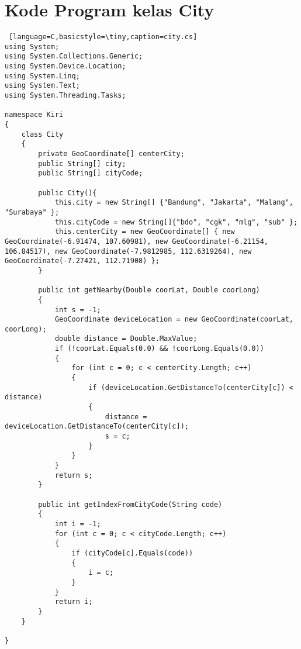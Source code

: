 \chapter{Kode Program kelas City}
\label{app:D}

\singlespacing 
%
%

\begin{lstlisting} [language=C,basicstyle=\tiny,caption=city.cs]
using System;
using System.Collections.Generic;
using System.Device.Location;
using System.Linq;
using System.Text;
using System.Threading.Tasks;

namespace Kiri
{
    class City
    {
        private GeoCoordinate[] centerCity;
        public String[] city;
        public String[] cityCode;

        public City(){
            this.city = new String[] {"Bandung", "Jakarta", "Malang", "Surabaya" };
            this.cityCode = new String[]{"bdo", "cgk", "mlg", "sub" };
            this.centerCity = new GeoCoordinate[] { new GeoCoordinate(-6.91474, 107.60981), new GeoCoordinate(-6.21154, 106.84517), new GeoCoordinate(-7.9812985, 112.6319264), new GeoCoordinate(-7.27421, 112.71908) };
        }

        public int getNearby(Double coorLat, Double coorLong)
        {
            int s = -1;
            GeoCoordinate deviceLocation = new GeoCoordinate(coorLat, coorLong);
            double distance = Double.MaxValue;
            if (!coorLat.Equals(0.0) && !coorLong.Equals(0.0))
            {
                for (int c = 0; c < centerCity.Length; c++)
                {
                    if (deviceLocation.GetDistanceTo(centerCity[c]) < distance)
                    {
                        distance = deviceLocation.GetDistanceTo(centerCity[c]);
                        s = c;
                    }
                }
            }
            return s;
        }

        public int getIndexFromCityCode(String code)
        {
            int i = -1;
            for (int c = 0; c < cityCode.Length; c++)
            {
                if (cityCode[c].Equals(code))
                {
                    i = c;
                }
            }
            return i;
        }
    }

}
\end{lstlisting}